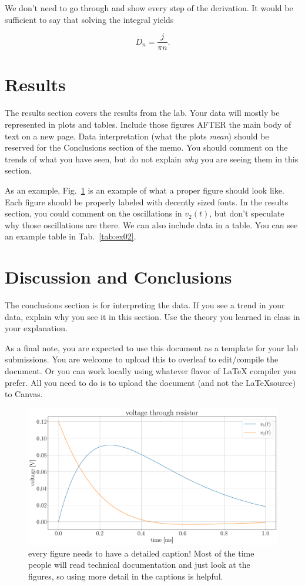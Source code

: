 \documentclass[11pt]{texMemo-gibbons}
\begin{document}
We don't need to go through and show every step of the
derivation.  It would be sufficient to say that solving
the integral yields

\begin{equation}
  \label{eq:2}
  D_n = \frac{j}{\pi n}.
\end{equation}


\section{Results}
\label{sec:results}

The results section covers the results from the lab.
Your data will mostly be represented in plots and tables.
Include those figures AFTER the main body of text on
a new page.  Data interpretation (what the plots \emph{mean})
should be reserved for the Conclusions section of the
memo.  You should comment on the trends of what you
have seen, but do not explain \emph{why} you are seeing
them in this section.

As an example, Fig.~\ref{fig:ex01} is an example of
what a proper figure should look like.  Each figure
should be properly labeled with decently sized fonts.
In the results section, you could comment  on the oscillations
in $v_2(t)$, but don't speculate why those oscillations
are there.  We can also include data in a table.  You
can see an example table in Tab.~\ref{tab:ex02}.  

\section{Discussion and Conclusions}
\label{sec:conclusions}

The conclusions section is for interpreting the data.
If you see a trend in your data, explain why you see
it in this section.  Use the theory you learned in class
in your explanation.

As a final note, you are expected to use this document
as a template for your lab submissions.  You are welcome
to upload this to overleaf to edit/compile the document.
Or you can work locally using whatever flavor of \LaTeX
compiler you prefer.  All you need to do is to upload
the document (and not the \LaTeX  source) to Canvas.

\clearpage

\begin{figure}[h!]
  \centering
  \includegraphics[width=0.7\linewidth]{fig_ex.pdf}
  \caption{every figure needs to have a detailed caption!  Most of the time people will read technical documentation and just look at the figures, so using more detail in the captions is helpful.}
  \label{fig:ex01}
\end{figure}
\end{document}
